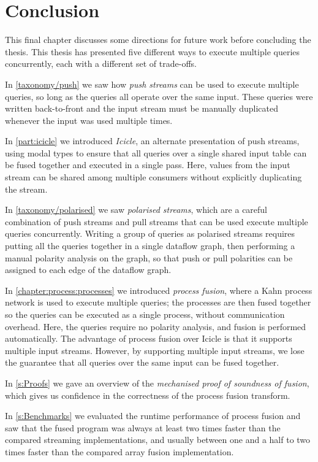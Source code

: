 \chapter{Conclusion}
\label{conclusion}

This final chapter discusses some directions for future work before concluding the thesis.
This thesis has presented five different ways to execute multiple queries concurrently, each with a different set of trade-offs.

In \cref{taxonomy/push} we saw how \emph{push streams} can be used to execute multiple queries, so long as the queries all operate over the same input.
These queries were written back-to-front and the input stream must be manually duplicated whenever the input was used multiple times.

In \cref{part:icicle} we introduced \emph{Icicle}, an alternate presentation of push streams, using modal types to ensure that all queries over a single shared input table can be fused together and executed in a single pass.
Here, values from the input stream can be shared among multiple consumers without explicitly duplicating the stream.

In \cref{taxonomy/polarised} we saw \emph{polarised streams}, which are a careful combination of push streams and pull streams that can be used execute multiple queries concurrently.
Writing a group of queries as polarised streams requires putting all the queries together in a single dataflow graph, then performing a manual polarity analysis on the graph, so that push or pull polarities can be assigned to each edge of the dataflow graph.

In \cref{chapter:process:processes} we introduced \emph{process fusion}, where a Kahn process network is used to execute multiple queries; the processes are then fused together so the queries can be executed as a single process, without communication overhead.
Here, the queries require no polarity analysis, and fusion is performed automatically.
The advantage of process fusion over Icicle is that it supports multiple input streams.
However, by supporting multiple input streams, we lose the guarantee that all queries over the same input can be fused together.

In \cref{s:Proofs} we gave an overview of the \emph{mechanised proof of soundness of fusion}, which gives us confidence in the correctness of the process fusion transform.

In \cref{s:Benchmarks} we evaluated the runtime performance of process fusion and saw that the fused program was always at least two times faster than the compared streaming implementations, and usually between one and a half to two times faster than the compared array fusion implementation.

